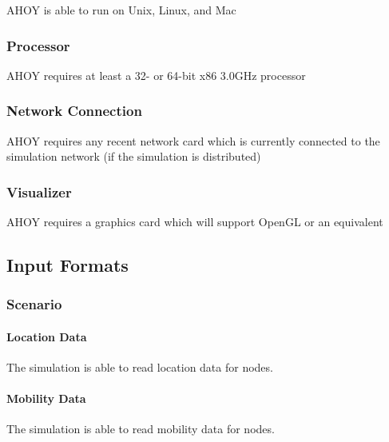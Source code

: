 \documentclass[titlepage]{article}
\begin{document}
AHOY is able to run on Unix, Linux, and Mac


\subsubsection{Processor%
  \label{processor}%
}

AHOY requires at least a 32- or 64-bit x86 3.0GHz processor


\subsubsection{Network Connection%
  \label{network-connection}%
}

AHOY requires any recent network card which is currently connected to the simulation network (if the simulation is
distributed)


\subsubsection{Visualizer%
  \label{visualizer}%
}

AHOY requires a graphics card which will support OpenGL or an equivalent


\subsection{Input Formats%
  \label{input-formats}%
}

\subsubsection{Scenario}
    \paragraph{Location Data} The simulation is able to read location data for nodes.
	\paragraph{Mobility Data} The simulation is able to read mobility data for nodes.
\end{document}
